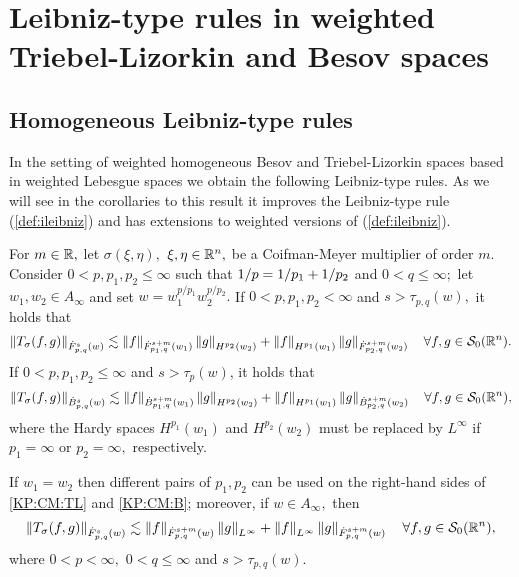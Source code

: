 { 
 
 \section{Leibniz-type rules in weighted Triebel-Lizorkin and Besov spaces}\label{ch2_results}
 
 \subsection{Homogeneous Leibniz-type rules}
 
 In the setting of weighted homogeneous Besov and Triebel-Lizorkin spaces based in weighted Lebesgue spaces we obtain the following Leibniz-type rules. As we will see in the corollaries to this result it improves the Leibniz-type rule (\ref{def:ileibniz}) and has extensions to weighted versions of (\ref{def:ileibniz}).
  
  \begin{theorem}\label{thm:CM:TL:B}  For $m \in \re,$ let $\sigma(\xi,\eta),$ $\xi,\eta\in\rn,$ be a Coifman-Meyer multiplier of order $m.$ Consider  $0 < p, p_1, p_2  \le \infty$  such that $\hcline$ and  $0 < q \leq \infty;$ let  $w_1,w_2\in A_\infty$ and set $w=w_1^{{p}/{p_1}} w_2^{{p}/{p_2}}.$ 
If $0 < p,p_1,p_2 < \infty$ and  $s > \tau_{p,q}(w),$  it holds that
\begin{equation}\label{KP:CM:TL}
\norm{T_\sigma(f,g)}{\tlw{p}{s}{q}{w}} \lesssim \norm{f}{\tlw{p_1}{s+m}{q}{w_1} } \norm{g}{H^{p_2}(w_2)} +  \norm{f}{H^{p_1}(w_1)}   \norm{g}{\tlw{p_2}{s+m}{q}{w_2} } \quad \forall f, g \in \swz.
\end{equation}
If $0< p, p_1,p_2\leq \infty$ and $s > \tau_p(w)$, it holds that
\begin{equation}\label{KP:CM:B}
\norm{T_\sigma(f,g)}{\besw{p}{s}{q}{w}} \lesssim \norm{f}{\besw{p_1}{s+m}{q}{w_1} } \norm{g}{H^{p_2}(w_2)} +  \norm{f}{H^{p_1}(w_1)}   \norm{g}{\besw{p_2}{s+m}{q}{w_2} } \quad \forall f, g \in \swz,
\end{equation}
where the Hardy spaces $H^{p_1}(w_1)$ and $H^{p_2}(w_2)$ must be replaced by $L^\infty$ if $p_1=\infty$ or $p_2=\infty,$ respectively.

If $w_1=w_2$ then different pairs of $p_1, p_2$ can be used on the right-hand sides of \eqref{KP:CM:TL} and \eqref{KP:CM:B}; moreover, if $w\in A_\infty,$ then 
\begin{equation}\label{KP:CM:TL2}
\norm{T_\sigma(f,g)}{\tlw{p}{s}{q}{w}} \lesssim \norm{f}{\tlw{p}{s+m}{q}{w} } \norm{g}{L^\infty} +  \norm{f}{L^\infty}   \norm{g}{\tlw{p}{s+m}{q}{w}} \quad \forall f, g \in \swz,
\end{equation}
where $0<p<\infty,$ $0<q\le\infty$ and $s>\tau_{p,q}(w).$
\end{theorem}

}
